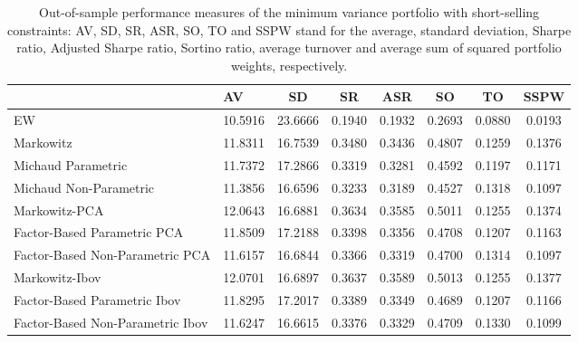 \begin{table}

\caption{\label{tab:empirical_mvp}Out-of-sample performance measures of the minimum variance portfolio with short-selling constraints: AV, SD, SR, ASR, SO, TO and SSPW stand for the average, standard deviation, Sharpe ratio, Adjusted Sharpe ratio, Sortino ratio, average turnover and average sum of squared portfolio weights, respectively.}
\centering
\begin{tabular}[t]{l|l|c|c|c|c|c|c}
\hline
  & AV & SD & SR & ASR & SO & TO & SSPW\\
\hline
EW & 10.5916 & 23.6666 & 0.1940 & 0.1932 & 0.2693 & 0.0880 & 0.0193\\
\hline
Markowitz & 11.8311 & 16.7539 & 0.3480 & 0.3436 & 0.4807 & 0.1259 & 0.1376\\
\hline
Michaud Parametric & 11.7372 & 17.2866 & 0.3319 & 0.3281 & 0.4592 & 0.1197 & 0.1171\\
\hline
Michaud Non-Parametric & 11.3856 & 16.6596 & 0.3233 & 0.3189 & 0.4527 & 0.1318 & 0.1097\\
\hline
Markowitz-PCA & 12.0643 & 16.6881 & 0.3634 & 0.3585 & 0.5011 & 0.1255 & 0.1374\\
\hline
Factor-Based Parametric PCA & 11.8509 & 17.2188 & 0.3398 & 0.3356 & 0.4708 & 0.1207 & 0.1163\\
\hline
Factor-Based Non-Parametric PCA & 11.6157 & 16.6844 & 0.3366 & 0.3319 & 0.4700 & 0.1314 & 0.1097\\
\hline
Markowitz-Ibov & 12.0701 & 16.6897 & 0.3637 & 0.3589 & 0.5013 & 0.1255 & 0.1377\\
\hline
Factor-Based Parametric Ibov & 11.8295 & 17.2017 & 0.3389 & 0.3349 & 0.4689 & 0.1207 & 0.1166\\
\hline
Factor-Based Non-Parametric Ibov & 11.6247 & 16.6615 & 0.3376 & 0.3329 & 0.4709 & 0.1330 & 0.1099\\
\hline
\end{tabular}
\end{table}
